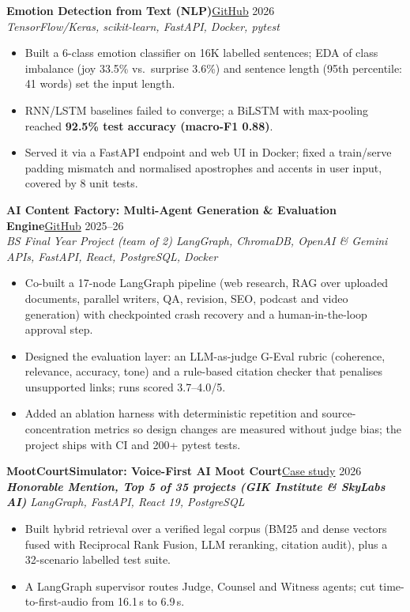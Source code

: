 \documentclass[10pt,a4paper]{article}
\newcommand{\project}[3]{%
  \par\addvspace{2.5pt}\textbf{#1}\hfill{\small #2}\\[-1pt]{\small\itshape #3}\par}
\begin{document}
\project{Emotion Detection from Text (NLP)}
  {\href{https://github.com/Shah-123/Emotion_detection}{GitHub} \textbar{} 2026}
  {TensorFlow/Keras, scikit-learn, FastAPI, Docker, pytest}
\begin{itemize}
  \item Built a 6-class emotion classifier on 16K labelled sentences; EDA of class imbalance
        (joy 33.5\% vs.\ surprise 3.6\%) and sentence length (95th percentile: 41 words) set the input length.
  \item RNN/LSTM baselines failed to converge; a BiLSTM with max-pooling reached
        \textbf{92.5\% test accuracy (macro-F1 0.88)}.
  \item Served it via a FastAPI endpoint and web UI in Docker; fixed a train/serve padding
        mismatch and normalised apostrophes and accents in user input, covered by 8 unit tests.
\end{itemize}

\project{AI Content Factory: Multi-Agent Generation \& Evaluation Engine}
  {\href{https://github.com/Shah-123/Ai-Content-Facotry}{GitHub} \textbar{} 2025--26}
  {BS Final Year Project (team of 2) \textbullet{} LangGraph, ChromaDB, OpenAI \& Gemini APIs,
   FastAPI, React, PostgreSQL, Docker}
\begin{itemize}
  \item Co-built a 17-node LangGraph pipeline (web research, RAG over uploaded documents, parallel
        writers, QA, revision, SEO, podcast and video generation) with checkpointed crash recovery
        and a human-in-the-loop approval step.
  \item Designed the evaluation layer: an LLM-as-judge G-Eval rubric (coherence, relevance, accuracy,
        tone) and a rule-based citation checker that penalises unsupported links; runs scored 3.7--4.0/5.
  \item Added an ablation harness with deterministic repetition and source-concentration metrics so
        design changes are measured without judge bias; the project ships with CI and 200+ pytest tests.
\end{itemize}

\project{MootCourtSimulator: Voice-First AI Moot Court}
  {\href{https://shah-123.github.io/my_portfolio.github.io/}{Case study} \textbar{} 2026}
  {\textbf{Honorable Mention, Top 5 of 35 projects (GIK Institute \& SkyLabs AI)} \textbullet{}
   LangGraph, FastAPI, React 19, PostgreSQL}
\begin{itemize}
  \item Built hybrid retrieval over a verified legal corpus (BM25 and dense vectors fused with
        Reciprocal Rank Fusion, LLM reranking, citation audit), plus a 32-scenario labelled test suite.
  \item A LangGraph supervisor routes Judge, Counsel and Witness agents; cut time-to-first-audio
        from 16.1\,s to 6.9\,s.
\end{itemize}
\end{document}
